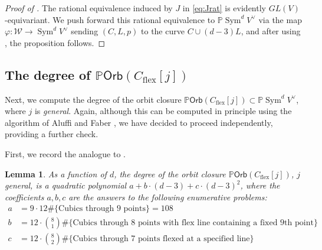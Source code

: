 \documentclass[12 pt, reqno]{amsart}
\newtheorem{lem}[thm]{Lemma}
\theoremstyle{definition}
\newcommand{\on}{\operatorname}
\newcommand{\mb}{\mathbb}
\renewcommand{\P}{\mb{P}}
\newcommand{\Orb}{\mathsf{Orb}}
\begin{document}
\begin{proof}[Proof of ]\label{proof:CANCBN}
  The rational equivalence induced by $J$ in \eqref{eq:Jrat} is
  evidently $GL(V)$-equivariant. We push forward this rational
  equivalence to $\P \on{Sym}^{d}V^{\vee}$ via the map
  $\varphi: \mathcal{W} \to \on{Sym}^{d}V^{\vee}$ sending $(C,L,p)$ to
  the curve $C \cup (d-3)L$, and after using , the
  proposition follows.
\end{proof}


\subsection{The degree of $\P \Orb(C_{\on{flex}}[j])$} Next, we
compute the degree of the orbit closure
$\P \Orb(C_{\on{flex}}[j]) \subset \P \on{Sym}^{d}V^{\vee}$, where $j$
is {\sl general}.  Again, although this can be computed in principle
using the algorithm of Aluffi and Faber \cite{AF00}, we have decided
to proceed independently, providing a further check.


First, we record the analogue to .
\begin{lem}
  \label{lem:Cflexpoly} As a function of $d$, the degree of the orbit
  closure $\P \Orb(C_{\on{flex}}[j])$, $j$ general, is a quadratic
  polynomial $a + b\cdot(d-3) + c \cdot (d-3)^{2}$, where the
  coefficients $a,b,c$ are the answers to the following enumerative
  problems:
\begin{align*}
  a &= 9\cdot 12\# \{\textrm{Cubics through 9 points} \}= 108\\
  b &= 12\cdot \binom{8}{1}\# \{\text{Cubics through 8 points with flex line containing a fixed 9th point}\}\\
  c &= 12\cdot \binom{8}{2} \#\{\text{Cubics through 7 points flexed at a specified line}\}
\end{align*}
\end{lem}

\end{document}
